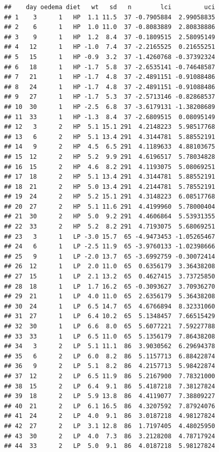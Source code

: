 \documentclass[12pt,a4paper]{book}
\theoremstyle{definition}
\theoremstyle{definition}
\theoremstyle{definition}
\theoremstyle{remark}
\begin{document}
\begin{verbatim}
##    day oedema diet   wt   sd   n        lci         uci
## 1    3      1   HP  1.1 11.5  37 -0.7905884  2.99058835
## 2    6      1   HP  1.0 11.0  37 -0.8083889  2.80838886
## 3    9      1   HP  1.2  8.4  37 -0.1809515  2.58095149
## 4   12      1   HP -1.0  7.4  37 -2.2165525  0.21655251
## 5   15      1   HP -0.9  3.2  37 -1.4260768 -0.37392324
## 6   18      1   HP -1.7  5.8  37 -2.6535141 -0.74648587
## 7   21      1   HP -1.7  4.8  37 -2.4891151 -0.91088486
## 8   24      1   HP -1.7  4.8  37 -2.4891151 -0.91088486
## 9   27      1   HP -1.7  5.3  37 -2.5713146 -0.82868537
## 10  30      1   HP -2.5  6.8  37 -3.6179131 -1.38208689
## 11  33      1   HP -1.3  8.4  37 -2.6809515  0.08095149
## 12   3      2   HP  5.1 15.1 291  4.2148223  5.98517768
## 13   6      2   HP  5.1 13.4 291  4.3144781  5.88552191
## 14   9      2   HP  4.5  6.5 291  4.1189633  4.88103675
## 15  12      2   HP  5.2  9.9 291  4.6196517  5.78034828
## 16  15      2   HP  4.6  8.2 291  4.1193075  5.08069251
## 17  18      2   HP  5.1 13.4 291  4.3144781  5.88552191
## 18  21      2   HP  5.0 13.4 291  4.2144781  5.78552191
## 19  24      2   HP  5.2 15.1 291  4.3148223  6.08517768
## 20  27      2   HP  5.1 11.6 291  4.4199960  5.78000404
## 21  30      2   HP  5.0  9.2 291  4.4606864  5.53931355
## 22  33      2   HP  5.2  8.2 291  4.7193075  5.68069251
## 23   3      1   LP -3.0 15.7  65 -4.9473453 -1.05265467
## 24   6      1   LP -2.5 11.9  65 -3.9760133 -1.02398666
## 25   9      1   LP -2.0 13.7  65 -3.6992759 -0.30072414
## 26  12      1   LP  2.0 11.0  65  0.6356179  3.36438208
## 27  15      1   LP  2.1 13.2  65  0.4627415  3.73725850
## 28  18      1   LP  1.7 16.2  65 -0.3093627  3.70936270
## 29  21      1   LP  4.0 11.0  65  2.6356179  5.36438208
## 30  24      1   LP  6.5 14.7  65  4.6766894  8.32331060
## 31  27      1   LP  6.4 10.2  65  5.1348457  7.66515429
## 32  30      1   LP  6.6  8.0  65  5.6077221  7.59227788
## 33  33      1   LP  6.5 11.0  65  5.1356179  7.86438208
## 34   3      2   LP  5.1 11.1  86  3.9030562  6.29694378
## 35   6      2   LP  6.0  8.2  86  5.1157713  6.88422874
## 36   9      2   LP  5.1  8.2  86  4.2157713  5.98422874
## 37  12      2   LP  6.5 11.9  86  5.2167900  7.78321000
## 38  15      2   LP  6.4  9.1  86  5.4187218  7.38127824
## 39  18      2   LP  5.9 13.8  86  4.4119077  7.38809227
## 40  21      2   LP  6.1 16.5  86  4.3207592  7.87924076
## 41  24      2   LP  4.0  9.1  86  3.0187218  4.98127824
## 42  27      2   LP  3.1 12.8  86  1.7197405  4.48025950
## 43  30      2   LP  4.0  7.3  86  3.2128208  4.78717924
## 44  33      2   LP  5.0  9.1  86  4.0187218  5.98127824
\end{verbatim}
\end{document}
